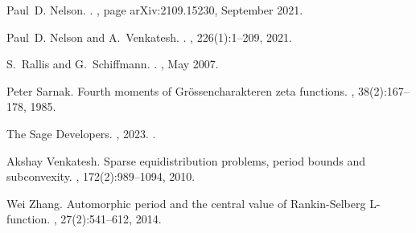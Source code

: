 \documentclass[reqno]{amsart}
\theoremstyle{plain} \newtheorem{theorem} {Theorem} \newtheorem{conjecture} {Conjecture} \newtheorem{corollary} [theorem] {Corollary} \newtheorem{proposition} [theorem] {Proposition} \newtheorem{fact} [theorem] {Fact}
\theoremstyle{definition} \newtheorem{definition} [theorem] {Definition}
\theoremstyle{itplain} %
\begin{document}
\begin{thebibliography}{10}
Paul~D. {Nelson}.
.
, page arXiv:2109.15230, September 2021.

Paul~D. {Nelson} and A.~{Venkatesh}.
.
, 226(1):1--209, 2021.

S.~{Rallis} and G.~{Schiffmann}.
.
, May 2007.

Peter Sarnak.
\newblock Fourth moments of {G}r\"ossencharakteren zeta functions.
, 38(2):167--178, 1985.

{The Sage Developers}.
, 2023.
.

Akshay Venkatesh.
\newblock Sparse equidistribution problems, period bounds and subconvexity.
, 172(2):989--1094, 2010.

Wei Zhang.
\newblock Automorphic period and the central value of {R}ankin-{S}elberg
  {L}-function.
, 27(2):541--612, 2014.

\end{thebibliography}
\end{document}
